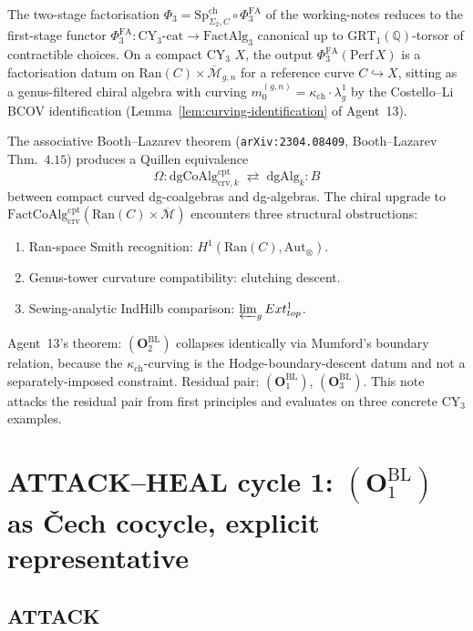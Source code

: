 \documentclass[11pt]{amsart}
\newcommand{\kch}{\kappa_{\mathrm{ch}}}
\newcommand{\Ran}{\mathrm{Ran}}
\newcommand{\FactCoAlg}{\mathrm{FactCoAlg}}
\newcommand{\crv}{\mathrm{crv}}
\newcommand{\cpt}{\mathrm{cpt}}
\newcommand{\dgAlg}{\mathrm{dgAlg}}
\newcommand{\dgCoAlg}{\mathrm{dgCoAlg}}
\newcommand{\Mbar}{\overline{\mathcal{M}}}
\newcommand{\Perf}{\mathrm{Perf}}
\newcommand{\bQ}{\mathbb{Q}}
\newcommand{\Ext}{\mathrm{Ext}}
\newcommand{\Aut}{\mathrm{Aut}}
\newcommand{\PhiFA}{\Phi^{\mathrm{FA}}}
\begin{document}
The two-stage factorisation $\Phi_3 = \mathrm{Sp}^{\mathrm{ch}}_{\Sigma_2, C}
\circ \PhiFA_3$ of the working-notes reduces to the first-stage
functor $\PhiFA_3 : \mathrm{CY}_3\text{-cat} \to \mathrm{FactAlg}_3$
canonical up to $\mathrm{GRT}_1(\bQ)$-torsor of contractible choices.
On a compact CY$_3$ $X$, the output $\PhiFA_3(\Perf\,X)$ is a
factorisation datum on $\Ran(C) \times \Mbar_{g,n}$ for a reference
curve $C \hookrightarrow X$, sitting as a genus-filtered chiral
algebra with curving $m_0^{(g,n)} = \kch \cdot \lambda_g^1$ by the
Costello--Li BCOV identification (Lemma~\ref{lem:curving-identification}
of Agent~13).

The associative Booth--Lazarev theorem (\texttt{arXiv:2304.08409},
Booth--Lazarev Thm.~$4.15$) produces a Quillen equivalence
\[
\Omega : \dgCoAlg^{\cpt}_{\crv, k} \;\rightleftarrows\; \dgAlg_k : B
\]
between compact curved dg-coalgebras and dg-algebras. The chiral upgrade
to $\FactCoAlg^{\cpt}_{\crv}(\Ran(C) \times \Mbar)$ encounters three
structural obstructions:
\begin{enumerate}[label=\textup{(}$\mathbf{O}_\arabic*^{\mathrm{BL}}$\textup{)}, leftmargin=3em]
\item Ran-space Smith recognition: $H^1(\Ran(C), \Aut_\otimes)$.
\item Genus-tower curvature compatibility: clutching descent.
\item Sewing-analytic IndHilb comparison:
$\varprojlim_g \Ext^1_{\mathrm{top}}$.
\end{enumerate}

Agent~13's theorem: $(\mathbf{O}_2^{\mathrm{BL}})$ collapses identically
via Mumford's boundary relation, because the $\kch$-curving is the
Hodge-boundary-descent datum and not a separately-imposed constraint.
Residual pair: $(\mathbf{O}_1^{\mathrm{BL}})$,
$(\mathbf{O}_3^{\mathrm{BL}})$. This note attacks the residual pair
from first principles and evaluates on three concrete CY$_3$ examples.

\section{ATTACK--HEAL cycle 1: $(\mathbf{O}_1^{\mathrm{BL}})$ as
\v{C}ech cocycle, explicit representative}
\label{sec:cycle-1-O1-cech}

\subsection*{ATTACK}
\end{document}
